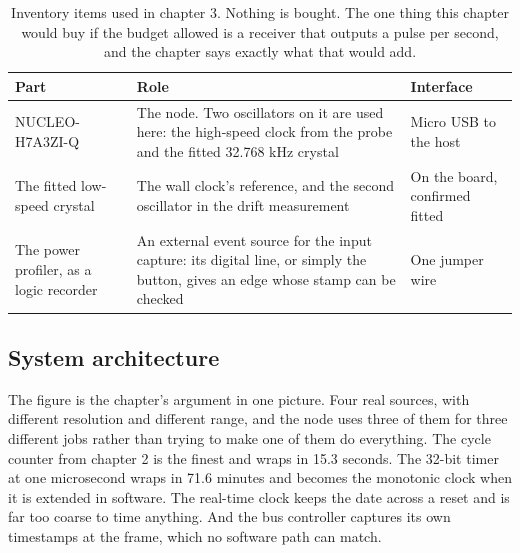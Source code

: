 \begin{table}[H]\centering\small
\begin{tabular}{p{40mm}p{66mm}p{40mm}}
\toprule
Part & Role & Interface \\
\midrule
NUCLEO-H7A3ZI-Q & The node. Two oscillators on it are used here: the high-speed clock from the probe and the fitted 32.768 kHz crystal & Micro USB to the host \\
The fitted low-speed crystal & The wall clock's reference, and the second oscillator in the drift measurement & On the board, confirmed fitted \\
The power profiler, as a logic recorder & An external event source for the input capture: its digital line, or simply the button, gives an edge whose stamp can be checked & One jumper wire \\
\bottomrule
\end{tabular}
\caption{Inventory items used in chapter 3. Nothing is bought. The one thing this chapter would buy if the budget allowed is a receiver that outputs a pulse per second, and the chapter says exactly what that would add.}
\end{table}

\subsection*{System architecture}


The figure is the chapter's argument in one picture. Four real sources, with
different resolution and different range, and the node uses three of them for
three different jobs rather than trying to make one of them do everything. The
cycle counter from chapter 2 is the finest and wraps in 15.3 seconds. The
32-bit timer at one microsecond wraps in 71.6 minutes and becomes the monotonic
clock when it is extended in software. The real-time clock keeps the date across
a reset and is far too coarse to time anything. And the bus controller captures
its own timestamps at the frame, which no software path can match.

